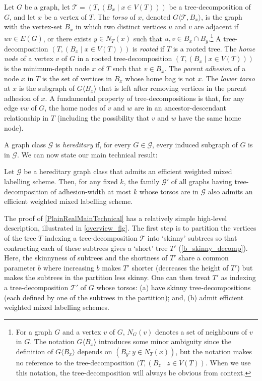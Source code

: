 \documentclass{patmorin}
\newcommand{\vida}[1]{\noindent{\color{pink} VD: #1}}
\newcommand{\pat}[1]{\noindent\textcolor{Magenta}{PaMo: #1}}
\newcommand{\defin}[1]{\emph{\textcolor{brightmaroon}{#1}}}
\newcommand{\torso}[2]{{#1}\langle{#2}\rangle}
\newcommand{\calG}{\mathcal{G}}
\newcommand{\calQ}{\mathcal{Q}}
\newcommand{\calT}{\mathcal{T}}
\begin{document}
Let $G$ be a graph,
let $\calT=(T,(B_x \mid x\in V(T)))$ be a tree-decomposition of $G$, and let $x$ be a vertex of $T$.
The \defin{torso} of $x$, denoted \defin{$\torso{G}{\calT,B_x}$},
 is the graph with the vertex-set $B_x$ in which two distinct vertices $u$ and $v$ are adjacent
  if $uv \in E(G)$, or there exists $y \in N_T(x)$  such that $u,v \in B_x \cap B_y$.\footnote{For a graph $G$ and a vertex $v$ of $G$, $N_G(v)$ denotes a set of neighbours of $v$ in $G$. The notation $\torso{G}{B_x}$ introduces some minor ambiguity since the definition of $\torso{G}{B_x}$ depends on $(B_y:y\in N_T(x))$, but the notation makes no reference to the tree-decomposition $(T, (B_z\mid z\in V(T))$.  When we use this notation, the tree-decomposition will always be obvious from context.}
  A tree-decomposition $(T,(B_x \mid x\in V(T)))$ is \defin{rooted} if $T$ is a rooted tree.  The \defin{home node} of a vertex $v$ of $G$ in a rooted tree-decomposition $(T,(B_x \mid x\in V(T)))$ is the minimum-depth node $x$ of $T$ such that $v\in B_x$.  The \defin{parent adhesion} of a node $x$ in $T$ is the set of vertices in $B_x$ whose home bag is not $x$.  The \defin{lower torso} at $x$ is the subgraph of $\torso{G}{B_x}$ that is left after removing vertices in the parent adhesion of $x$. A fundamental property of tree-decompositions is that, for any edge $vw$ of $G$, the home nodes of $v$ and $w$ are in an ancestor-descendant relationship in $T$ (including the possibility that $v$ and $w$ have the same home node).

  A graph class $\calG$ is \defin{hereditary} if, for every $G\in\calG$, every induced subgraph of $G$ is in $\calG$. We can now state our main technical result:
  \begin{thm}\label{PlainRealMainTechnical}
        Let $\calG$ be a hereditary graph class that admits an efficient weighted mixed labelling scheme. Then, for any fixed $k$, the family $\calG'$ of all graphs having tree-decomposition of adhesion-width at most $k$ whose torsos are in $\calG$ also admits an efficient weighted mixed labelling scheme.
  \end{thm}

  The proof of \cref{PlainRealMainTechnical} has a relatively simple high-level description, illustrated in \cref{overview_fig}.  The first step is to partition the vertices of the tree $T$ indexing a tree-decomposition $\calT$ into `skinny' subtrees so that contracting each of these subtrees gives a `short' tree $T'$ (\cref{b_skinny_decomp}).  Here, the skinnyness of subtrees and the shortness of $T'$ share a common parameter \defin{$b$} where increasing $b$ makes $T'$ shorter (decreases the height of $T'$) but makes the subtrees in the partition less skinny.  One can then treat $T'$ as indexing a tree-decomposition $\calT'$ of $G$ whose torsos: (a) have skinny tree-decompositions (each defined by one of the subtrees in the partition); and, (b) admit efficient weighted mixed labelling schemes.
\end{document}
